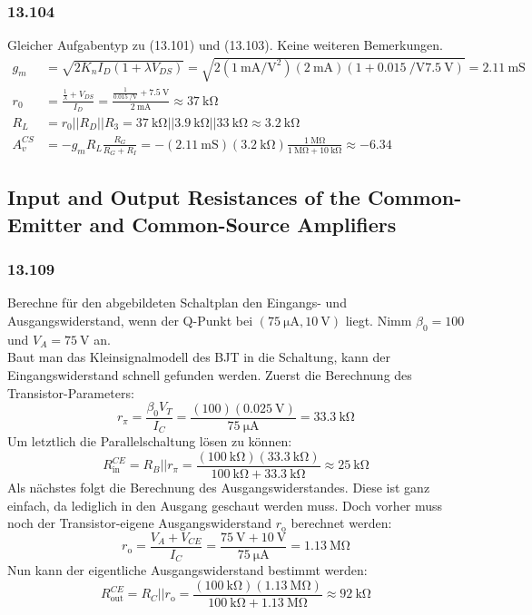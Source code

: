 \documentclass[11pt,a4paper,titlepage]{article}
\begin{document}
\subsubsection*{13.104}
Gleicher Aufgabentyp zu (13.101) und (13.103). Keine weiteren Bemerkungen.
\begin{equation} 
\begin{aligned}
g_m &= \sqrt{2K_nI_D(1+\lambda V_{DS})} = \sqrt{2(\SI{1}{\milli\ampere\per\square\volt})(\SI{2}{\milli\ampere})(1+\SI{0.015}{\per\volt}\SI{7.5}{\volt})} = \SI{2.11}{\milli\siemens} \\
r_0 &= \frac{\frac{1}{\lambda}+V_{DS}}{I_D} = \frac{\frac{1}{\SI{0.015}{\per\volt}}+\SI{7.5}{\volt}}{\SI{2}{\milli\ampere}} \approx \SI{37}{\kilo\ohm}\\
R_L &= r_0||R_D||R_3 = \SI{37}{\kilo\ohm} || \SI{3.9}{\kilo\ohm} || \SI{33}{\kilo\ohm} \approx \SI{3.2}{\kilo\ohm} \\
A_v^{CS} &= -g_mR_L\frac{R_G}{R_G+R_I} = -(\SI{2.11}{\milli\siemens})(\SI{3.2}{\kilo\ohm}) \frac{\SI{1}{\mega\ohm}}{\SI{1}{\mega\ohm} + \SI{10}{\kilo\ohm}} \approx - 6.34
\end{aligned}
\end{equation}

\subsection*{Input and Output Resistances of the Common-Emitter and Common-Source Amplifiers}
\subsubsection*{13.109}
Berechne für den abgebildeten Schaltplan den Eingangs- und Ausgangswiderstand, wenn der Q-Punkt bei $(\SI{75}{\micro\ampere}, \SI{10}{\volt})$ liegt. Nimm $\beta_0=100$ und $V_A=\SI{75}{\volt}$ an.\\
Baut man das Kleinsignalmodell des BJT in die Schaltung, kann der Eingangswiderstand schnell gefunden werden. Zuerst die Berechnung des Transistor-Parameters:
\[ r_{\pi} = \frac{\beta_0V_T}{I_C} = \frac{(100)(\SI{0.025}{\volt})}{\SI{75}{\micro\ampere}} = \SI{33.3}{\kilo\ohm}\]
Um letztlich die Parallelschaltung lösen zu können:
\[ R_{\text{in}}^{CE} = R_B || r_{\pi} =  \frac{(\SI{100}{\kilo\ohm})(\SI{33.3}{\kilo\ohm})}{\SI{100}{\kilo\ohm}+\SI{33.3}{\kilo\ohm}} \approx \SI{25}{\kilo\ohm}\]
Als nächstes folgt die Berechnung des Ausgangswiderstandes. Diese ist ganz einfach, da lediglich in den Ausgang geschaut werden muss. Doch vorher muss noch der Transistor-eigene Ausgangswiderstand $r_{\text{o}}$ berechnet werden:
\[ r_{\text{o}} = \frac{V_A+V_{CE}}{I_C} = \frac{\SI{75}{\volt} + \SI{10}{\volt}}{\SI{75}{\micro\ampere}} = \SI{1.13}{\mega\ohm} \]
Nun kann der eigentliche Ausgangswiderstand bestimmt werden:
\[ R_{\text{out}}^{CE} = R_C || r_{\text{o}} = \frac{(\SI{100}{\kilo\ohm})(\SI{1.13}{\mega\ohm})}{\SI{100}{\kilo\ohm} + \SI{1.13}{\mega\ohm}} \approx \SI{92}{\kilo\ohm}  \]
\end{document}

